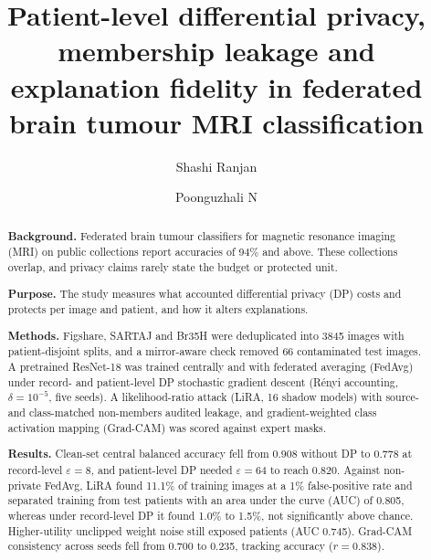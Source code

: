 \documentclass[preprint,12pt]{elsarticle}
\begin{document}
\begin{frontmatter}

\title{Patient-level differential privacy, membership leakage and explanation fidelity in federated brain tumour MRI
classification}

\author[aff1]{Shashi Ranjan}
\author[aff1]{Poonguzhali N}

\begin{abstract}
\noindent\textbf{Background.} Federated brain tumour classifiers for magnetic resonance imaging (MRI) on public
collections report accuracies of 94\% and above. These collections overlap, and privacy claims rarely state
the budget or protected unit.

\noindent\textbf{Purpose.} The study measures what accounted differential privacy (DP) costs and protects per
image and patient, and how it alters explanations.

\noindent\textbf{Methods.} Figshare, SARTAJ and Br35H were deduplicated into 3845 images with
patient-disjoint splits, and a mirror-aware check removed 66 contaminated test images. A pretrained ResNet-18 was
trained centrally and with federated averaging (FedAvg) under record- and patient-level DP stochastic gradient descent
(R\'enyi accounting, $\delta=10^{-5}$, five seeds). A likelihood-ratio attack (LiRA, 16 shadow models) with
source- and class-matched non-members audited leakage, and gradient-weighted class activation mapping (Grad-CAM) was scored against expert masks.

\noindent\textbf{Results.} Clean-set central balanced accuracy fell from 0.908 without DP to 0.778
at record-level $\varepsilon=8$, and patient-level DP needed $\varepsilon=64$ to reach 0.820. Against non-private
FedAvg, LiRA found 11.1\% of training images at a 1\% false-positive rate and separated training from test patients
with an area under the curve (AUC) of 0.805, whereas under record-level DP it found 1.0\% to 1.5\%, not significantly
above chance. Higher-utility unclipped weight noise still exposed patients (AUC 0.745). Grad-CAM consistency across
seeds fell from 0.700 to 0.235, tracking accuracy ($r=0.838$).


\end{abstract}
\end{frontmatter}
\end{document}
